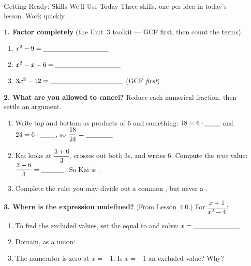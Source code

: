 \documentclass[10pt]{article}
\begin{document}
\namedateperiod

\vspace{0.10in}

\begin{notesbox}{Getting Ready: Skills We'll Use Today}
\small Three skills, one per idea in today's lesson. Work quickly.

\vspace{4pt}
\textbf{1. Factor completely} (the Unit~3 toolkit --- GCF first, then count the terms).
\begin{enumerate}[label=(\alph*), leftmargin=2.1em, itemsep=3pt]
  \item $x^2-9=\blank{3.4cm}$
  \item $x^2-x-6=\blank{3.4cm}$
  \item $3x^2-12=\blank{3.8cm}$ \quad (GCF \emph{first})
\end{enumerate}

\vspace{4pt}
\textbf{2. What are you allowed to cancel?} Reduce each numerical fraction, then settle an argument.
\begin{enumerate}[label=(\alph*), leftmargin=2.1em, itemsep=3pt]
  \item Write top and bottom as products of $6$ and something: $18=6\cdot\blank{0.8cm}$ \; and \;
        $24=6\cdot\blank{0.8cm}$, \; so $\dfrac{18}{24}=\blank{1.4cm}$
  \item Kai looks at $\dfrac{3+6}{3}$, crosses out both $3$s, and writes $6$. Compute the
        \emph{true} value: $\dfrac{3+6}{3}=\blank{1.2cm}$. \; So Kai is \blank{1.6cm}.
  \item Complete the rule: you may divide out a common \blank{2.2cm}, but never a
        \blank{2.2cm}.
\end{enumerate}

\vspace{4pt}
\textbf{3. Where is the expression undefined?} (From Lesson~4.0.) For
$\dfrac{x+1}{x^2-4}$:
\begin{enumerate}[label=(\alph*), leftmargin=2.1em, itemsep=3pt]
  \item To find the excluded values, set the \blank{3.2cm} equal to \blank{1.0cm} and solve:
        $x=\blank{2.4cm}$
  \item Domain, as a union: \blank{6.6cm}
  \item The numerator is zero at $x=-1$. Is $x=-1$ an excluded value? \blank{1.2cm} \;
        Why? \blank{4.6cm}
\end{enumerate}

\end{notesbox}
\end{document}
